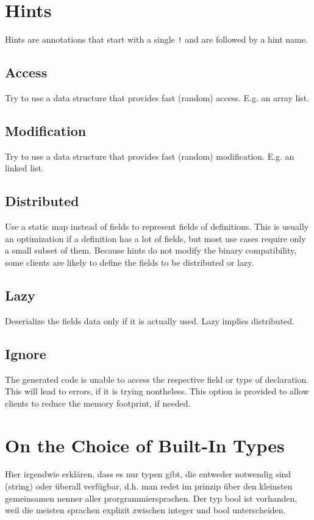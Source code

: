 \documentclass[a4paper,10pt]{article}
\begin{document}
\section{Hints}

Hints are annotations that start with a single \verb/!/ and are followed by a hint name.

\subsection*{Access}
Try to use a data structure that provides fast (random) access. E.g. an array list.

\subsection*{Modification}
Try to use a data structure that provides fast (random) modification. E.g. an linked list.

\subsection*{Distributed}
Use a static map instead of fields to represent fields of definitions. This is usually an optimization if a definition has a lot of fields, but most use cases require only a small subset of them. Because hints do not modify the binary compatibility, some clients are likely to define the fields to be distributed or lazy.

\subsection*{Lazy}
Deserialize the fields data only if it is actually used. Lazy implies distributed.

\subsection*{Ignore}
The generated code is unable to access the respective field or type of declaration. This will lead to errors, if it is trying nontheless. This option is provided to allow clients to reduce the memory footprint, if needed.

\section{On the Choice of Built-In Types}

Hier irgendwie erklären, dass es nur typen gibt, die entweder notwendig sind (string) oder überall verfügbar, d.h. man redet im prinzip über den kleinsten gemeinsamen nenner aller prorgrammiersprachen. Der typ bool ist vorhanden, weil die meisten sprachen explizit zwischen integer und bool unterscheiden.
\end{document}
